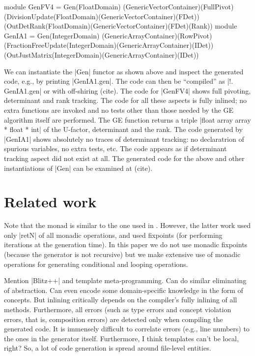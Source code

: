 \documentclass{llncs}
\begin{document}
\begin{code}
module GenFV4 = Gen(FloatDomain)
   (GenericVectorContainer)(FullPivot)
   (DivisionUpdate(FloatDomain)(GenericVectorContainer)(FDet))
   (OutDetRank(FloatDomain)(GenericVectorContainer)(FDet)(Rank))
module GenIA1 = Gen(IntegerDomain)
   (GenericArrayContainer)(RowPivot)
   (FractionFreeUpdate(IntegerDomain)(GenericArrayContainer)(IDet))
   (OutJustMatrix(IntegerDomain)(GenericArrayContainer)(IDet))
\end{code}

We can instantiate the |Gen| functor as shown above and inspect the
generated code, e.g., by printing |GenIA1.gen|. The code can then be
``compiled'' as |!. GenIA1.gen| or with off-shiring (cite). The code
for |GenFV4| shows full pivoting, determinant and rank tracking. The
code for all these aspects is fully inlined; no extra functions are
invoked and no tests other than those needed by the GE algorithm
itself are performed. The GE function returns a triple 
|float array array * float * int| of the U-factor, determinant and 
the rank. The
code generated by |GenIA1| shows absolutely no traces of determinant
tracking: no declaratrion of spurious variables, no extra tests,
etc. The code appears as if determinant tracking aspect did not exist
at all. The generated code for the above and other instantiations of
|Gen| can be examined at (cite).

\section{Related work}\label{related}

Note that the monad is similar to the one used in \cite{KiselyovTaha}.
However, the latter work used only |retN| of all monadic operations,
and used fixpoints (for performing iterations at the generation time).
In this paper we do not use monadic fixpoints (because the generator
is not recursive) but we make extensive use of monadic operations for
generating conditional and looping operations.

Mention |Blitz++| and template meta-programming. Can do similar
eliminating of abstraction. Can even encode some domain-specific
knowledge in the form of concepts. But inlining critically depends on
the compiler's fully inlining of all methods. Furthermore, all errors
(such as type errors and concept violation errors, that is,
composition errors) are detected only when compiling the generated
code. It is immensely difficult to correlate errors (e.g., line numbers) 
to the ones in the generator itself. Furthermore, I think templates
can't be local, right? So, a lot of code generation is spread around
file-level entities. 
\end{document}
